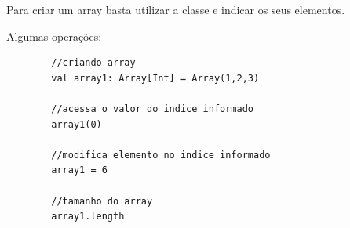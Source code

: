 	Para criar um array basta utilizar a classe e indicar os seus elementos.
	
	Algumas operações:
	\begin{lstlisting}
		//criando array
		val array1: Array[Int] = Array(1,2,3)
		
		//acessa o valor do indice informado
		array1(0)
		
		//modifica elemento no indice informado
		array1 = 6
		
		//tamanho do array
		array1.length
	\end{lstlisting}

